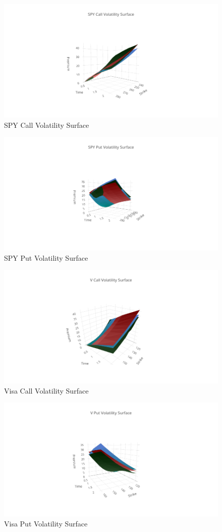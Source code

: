 \documentclass{article}
\begin{document}
\begin{figure}[h!]
\includegraphics[width =\textwidth]{images/VolSurface/SPYCall.png}
\caption{SPY Call Volatility Surface}
\centering
\end{figure}
\begin{figure}[h!]
\includegraphics[width =\textwidth]{images/VolSurface/SPYPut.png}
\caption{SPY Put Volatility Surface}
\centering
\end{figure}
\begin{figure}[h!]
\includegraphics[width =\textwidth]{images/VolSurface/VCall.png}
\caption{Visa Call Volatility Surface}
\centering
\end{figure}
\begin{figure}[h!]
\includegraphics[width =\textwidth]{images/VolSurface/VPut.png}
\caption{Visa Put Volatility Surface}
\centering
\end{figure}
\end{document}
